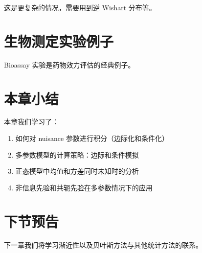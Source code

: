 这是更复杂的情况，需要用到逆 Wishart 分布等。

\section{生物测定实验例子}

Bioassay 实验是药物效力评估的经典例子。

\section{本章小结}

本章我们学习了：
\begin{enumerate}
  \item 如何对 nuisance 参数进行积分（边际化和条件化）
  \item 多参数模型的计算策略：边际和条件模拟
  \item 正态模型中均值和方差同时未知时的分析
  \item 非信息先验和共轭先验在多参数情况下的应用
\end{enumerate}

\section{下节预告}

下一章我们将学习渐近性以及贝叶斯方法与其他统计方法的联系。

\endinput
